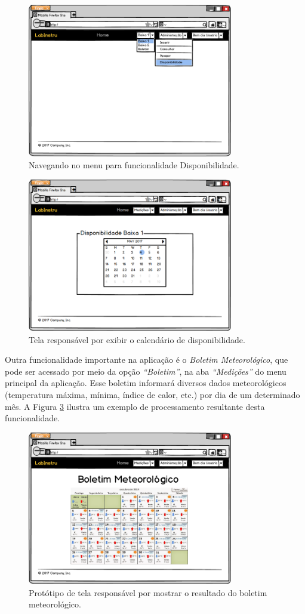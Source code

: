 \begin{figure}[H]
	\centering
	\includegraphics[width=0.8\textwidth]{./img/telas/tela072.png}
	\caption{Navegando no menu para funcionalidade Disponibilidade.} \label{fig:tela072}
\end{figure}

\begin{figure}[H]
	\centering
	\includegraphics[width=0.8\textwidth]{./img/telas/tela073.png}
	\caption{Tela responsável por exibir o calendário de disponibilidade.} \label{fig:tela073}
\end{figure}

Outra funcionalidade importante na aplicação é o \textit{Boletim Meteorológico}, que pode ser acessado por meio da opção \textit{``Boletim''}, na aba \textit{``Medições''} do menu principal da aplicação. Esse boletim informará diversos dados meteorológicos (temperatura máxima, mínima, índice de calor, etc.) por dia de um determinado mês. A Figura \ref{fig:tela077} ilustra um exemplo de processamento resultante desta funcionalidade.

\begin{figure}[H]
	\centering
	\includegraphics[width=0.8\textwidth]{./img/telas/tela077.png}
	\caption{Protótipo de tela responsável por mostrar o resultado do boletim meteorológico.} \label{fig:tela077}
\end{figure}
